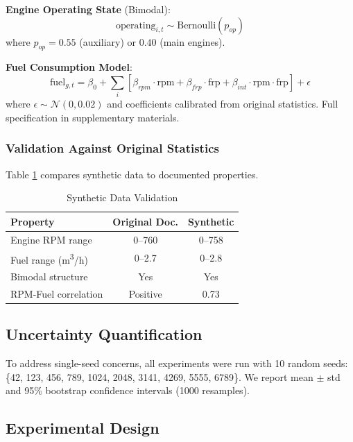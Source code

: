 \documentclass[conference]{IEEEtran}
\begin{document}
\textbf{Engine Operating State} (Bimodal):
\begin{equation}
\text{operating}_{i,t} \sim \text{Bernoulli}(p_{op})
\end{equation}
where $p_{op} = 0.55$ (auxiliary) or $0.40$ (main engines).

\textbf{Fuel Consumption Model}:
\begin{equation}
\text{fuel}_{g,t} = \beta_0 + \sum_i [\beta_{rpm} \cdot \text{rpm} + \beta_{frp} \cdot \text{frp} + \beta_{int} \cdot \text{rpm} \cdot \text{frp}] + \epsilon
\end{equation}
where $\epsilon \sim \mathcal{N}(0, 0.02)$ and coefficients calibrated from original statistics. Full specification in supplementary materials.

\subsubsection{Validation Against Original Statistics}

Table \ref{tab:validation} compares synthetic data to documented properties.

\begin{table}[htbp]
\caption{Synthetic Data Validation}
\label{tab:validation}
\centering
\begin{tabular}{lcc}
\toprule
\textbf{Property} & \textbf{Original Doc.} & \textbf{Synthetic} \\
\midrule
Engine RPM range & 0--760 & 0--758 \\
Fuel range (m\textsuperscript{3}/h) & 0--2.7 & 0--2.8 \\
Bimodal structure & Yes & Yes \\
RPM-Fuel correlation & Positive & 0.73 \\
\bottomrule
\end{tabular}
\end{table}

\subsection{Uncertainty Quantification}

To address single-seed concerns, all experiments were run with 10 random seeds: \{42, 123, 456, 789, 1024, 2048, 3141, 4269, 5555, 6789\}. We report mean $\pm$ std and 95\% bootstrap confidence intervals (1000 resamples).

\subsection{Experimental Design}
\end{document}
